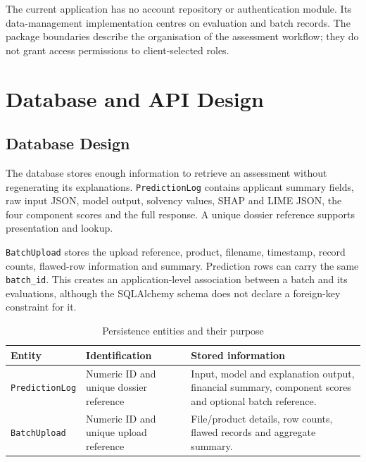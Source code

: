 The current application has no account repository or authentication module. Its data-management implementation centres on evaluation and batch records. The package boundaries describe the organisation of the assessment workflow; they do not grant access permissions to client-selected roles.


\clearpage
\section{Database and API Design}
\subsection{Database Design}
The database stores enough information to retrieve an assessment without regenerating its explanations. \texttt{PredictionLog} contains applicant summary fields, raw input JSON, model output, solvency values, SHAP and LIME JSON, the four component scores and the full response. A unique dossier reference supports presentation and lookup.

\texttt{BatchUpload} stores the upload reference, product, filename, timestamp, record counts, flawed-row information and summary. Prediction rows can carry the same \texttt{batch\_id}. This creates an application-level association between a batch and its evaluations, although the SQLAlchemy schema does not declare a foreign-key constraint for it.

\begin{table}[htbp]\centering\small
\caption{Persistence entities and their purpose}\label{tab:database-entities}
\begin{tabularx}{\textwidth}{p{3.1cm}XX}\toprule
Entity & Identification & Stored information\\\midrule
\texttt{PredictionLog} & Numeric ID and unique dossier reference & Input, model and explanation output, financial summary, component scores and optional batch reference.\\
\texttt{BatchUpload} & Numeric ID and unique upload reference & File/product details, row counts, flawed records and aggregate summary.\\\bottomrule
\end{tabularx}\end{table}

